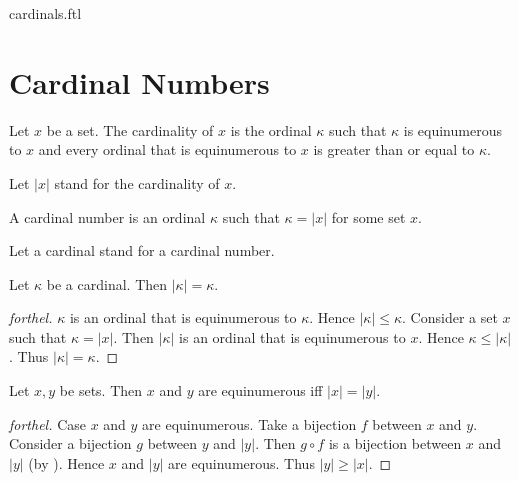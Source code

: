 \documentclass{naproche-library}
\begin{document}
\begin{smodule}{cardinals.ftl}

  \section*{Cardinal Numbers}

  \begin{definition}[forthel,id=SET_THEORY_06_8286266038681600,printid]
    Let $x$ be a set.
    The cardinality of $x$ is the ordinal $\kappa$ such that $\kappa$ is equinumerous to $x$ and every ordinal that is equinumerous to $x$ is greater than or equal to $\kappa$.

    Let $|x|$ stand for the cardinality of $x$.
  \end{definition}

  \begin{definition}[forthel,id=SET_THEORY_06_6818986081648640,printid]
    A cardinal number is an ordinal $\kappa$ such that $\kappa = |x|$ for some
    set $x$.

    Let a cardinal stand for a cardinal number.
  \end{definition}

  \begin{proposition}[forthel,id=SET_THEORY_06_2820082336006144,printid]
    Let $\kappa$ be a cardinal.
    Then $|\kappa| = \kappa$.
  \end{proposition}
  \begin{proof}[forthel]
    $\kappa$ is an ordinal that is equinumerous to $\kappa$.
    Hence $|\kappa| \leq \kappa$.
    Consider a set $x$ such that $\kappa = |x|$.
    Then $|\kappa|$ is an ordinal that is equinumerous to $x$.
    Hence $\kappa \leq |\kappa|$.
    Thus $|\kappa| = \kappa$.
  \end{proof}

  \begin{proposition}[forthel,id=SET_THEORY_06_6920913721229312,printid]
    Let $x, y$ be sets.
    Then $x$ and $y$ are equinumerous iff $|x| = |y|$.
  \end{proposition}
  \begin{proof}[forthel]
    Case $x$ and $y$ are equinumerous.
      Take a bijection $f$ between $x$ and $y$.
      Consider a bijection $g$ between $y$ and $|y|$.
      Then $g \circ f$ is a bijection between $x$ and $|y|$ (by ).
      Hence $x$ and $|y|$ are equinumerous.
      Thus $|y| \geq |x|$.


\end{proof}
\end{smodule}
\end{document}
